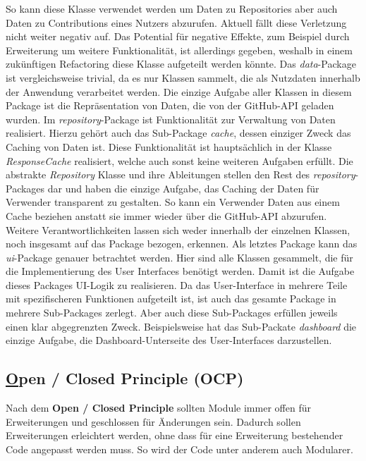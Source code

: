 So kann diese Klasse verwendet werden um Daten zu Repositories aber auch Daten zu Contributions eines Nutzers abzurufen.
Aktuell fällt diese Verletzung nicht weiter negativ auf.
Das Potential für negative Effekte, zum Beispiel durch Erweiterung um weitere Funktionalität, ist allerdings gegeben, weshalb in einem zukünftigen Refactoring diese Klasse aufgeteilt werden könnte.
\newline
Das \textit{data}-Package ist vergleichsweise trivial, da es nur Klassen sammelt, die als Nutzdaten innerhalb der Anwendung verarbeitet werden.
Die einzige Aufgabe aller Klassen in diesem Package ist die Repräsentation von Daten, die von der GitHub-API geladen wurden.
\newline
Im \textit{repository}-Package ist Funktionalität zur Verwaltung von Daten realisiert.
Hierzu gehört auch das Sub-Package \textit{cache}, dessen einziger Zweck das Caching von Daten ist.
Diese Funktionalität ist hauptsächlich in der Klasse \textit{ResponseCache} realisiert, welche auch sonst keine weiteren Aufgaben erfüllt.
Die abstrakte \textit{Repository} Klasse und ihre Ableitungen stellen den Rest des \textit{repository}-Packages dar und haben die einzige Aufgabe, das Caching der Daten für Verwender transparent zu gestalten.
So kann ein Verwender Daten aus einem Cache beziehen anstatt sie immer wieder über die GitHub-API abzurufen.
Weitere Verantwortlichkeiten lassen sich weder innerhalb der einzelnen Klassen, noch insgesamt auf das Package bezogen, erkennen.
\newline
Als letztes Package kann das \textit{ui}-Package genauer betrachtet werden.
Hier sind alle Klassen gesammelt, die für die Implementierung des User Interfaces benötigt werden.
Damit ist die Aufgabe dieses Packages UI-Logik zu realisieren.
Da das User-Interface in mehrere Teile mit spezifischeren Funktionen aufgeteilt ist, ist auch das gesamte Package in mehrere Sub-Packages zerlegt.
Aber auch diese Sub-Packages erfüllen jeweils einen klar abgegrenzten Zweck.
Beispielsweise hat das Sub-Packate \textit{dashboard} die einzige Aufgabe, die Dashboard-Unterseite des User-Interfaces darzustellen.


\newpage
\subsection{\underline{O}pen / Closed Principle (OCP)}

Nach dem \textbf{Open / Closed Principle} sollten Module immer offen für Erweiterungen und geschlossen für Änderungen sein.
Dadurch sollen Erweiterungen erleichtert werden, ohne dass für eine Erweiterung bestehender Code angepasst werden muss.
So wird der Code unter anderem auch Modularer.


